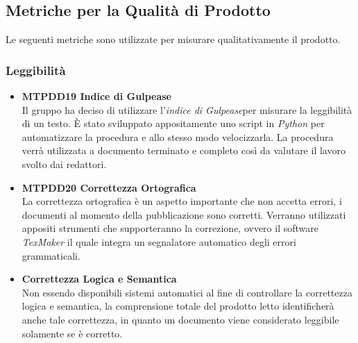 \subsection{Metriche per la Qualità di Prodotto}
Le seguenti metriche sono utilizzate per misurare qualitativamente il prodotto.


\subsubsection{Leggibilità}
\begin{itemize}
	\item \textbf{MTPDD19 Indice di Gulpease}\-\\
Il gruppo ha deciso di utilizzare l'\textit{indice di Gulpease}\glossario per misurare la leggibilità di un testo. È stato sviluppato appositamente uno script in \textit{Python} per automatizzare la procedura e allo stesso modo velocizzarla. La procedura verrà utilizzata a documento terminato e completo così da valutare il lavoro svolto dai redattori.

	\item \textbf{MTPDD20 Correttezza Ortografica}\-\\
La correttezza ortografica è un aspetto importante che non accetta errori, i documenti al momento della pubblicazione sono corretti. Verranno utilizzati appositi strumenti che supporteranno la correzione, ovvero il software \textit{TexMaker} il quale integra un segnalatore automatico degli errori grammaticali. 

	\item \textbf{Correttezza Logica e Semantica} \-\\
Non essendo disponibili sistemi automatici al fine di controllare la correttezza logica e semantica, la comprensione totale del prodotto letto identificherà anche tale correttezza, in quanto un documento viene considerato leggibile solamente se è corretto.
\end{itemize}

